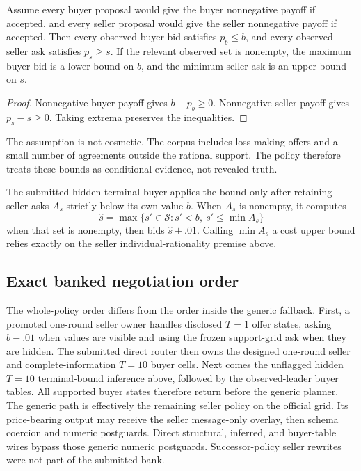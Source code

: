 \begin{proposition}
Assume every buyer proposal would give the buyer nonnegative payoff if accepted,
and every seller proposal would give the seller nonnegative payoff if accepted.
Then every observed buyer bid satisfies $p_b\leq b$, and every observed seller
ask satisfies $p_s\geq s$. If the relevant observed set is nonempty, the maximum
buyer bid is a lower bound on $b$, and the minimum seller ask is an upper bound
on $s$.
\end{proposition}
\begin{proof}
Nonnegative buyer payoff gives $b-p_b\geq0$. Nonnegative seller payoff gives
$p_s-s\geq0$. Taking extrema preserves the inequalities.
\end{proof}

The assumption is not cosmetic. The corpus includes loss-making offers and a
small number of agreements outside the rational support. The policy therefore
treats these bounds as conditional evidence, not revealed truth.

The submitted hidden terminal buyer applies the bound only after retaining
seller asks $A_s$ strictly below its own value $b$. When $A_s$ is nonempty, it
computes
\begin{equation}
\hat s=\max\{s'\in\mathcal S:s'<b,\ s'\leq\min A_s\}
\end{equation}
when that set is nonempty, then bids $\hat s+.01$. Calling $\min A_s$ a cost
upper bound relies exactly on the seller individual-rationality premise above.

\subsection{Exact banked negotiation order}

The whole-policy order differs from the order inside the generic fallback.
First, a promoted one-round seller owner handles disclosed $T=1$ offer states,
asking $b-.01$ when values are visible and using the frozen support-grid ask
when they are hidden. The submitted direct router then owns the designed
one-round seller and complete-information $T=10$ buyer cells. Next comes the
unflagged hidden $T=10$ terminal-bound inference above, followed by the
observed-leader buyer tables. All supported buyer states therefore return
before the generic planner. The generic path is effectively the remaining
seller policy on the official grid. Its price-bearing output may receive the
seller message-only overlay, then schema coercion and numeric postguards.
Direct structural, inferred, and buyer-table wires bypass those generic numeric
postguards. Successor-policy seller rewrites were not part of the submitted
bank.

